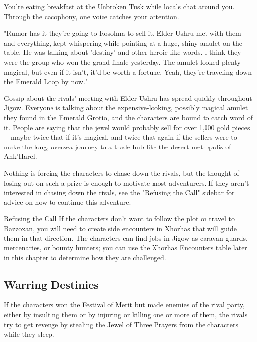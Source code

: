 \documentclass[10pt,a4paper,twoside,bg=print,twocolumn,openany,nodeprecatedcode]{dndbook}
\begin{document}
\begin{DndReadAloud}{}
You're eating breakfast at the Unbroken Tusk while locals chat around you. Through the cacophony, one voice catches your attention.

"Rumor has it they're going to Rosohna to sell it. Elder Ushru met with them and everything, kept whispering while pointing at a huge, shiny amulet on the table. He was talking about 'destiny' and other heroic-like words. I think they were the group who won the grand finale yesterday. The amulet looked plenty magical, but even if it isn't, it'd be worth a fortune. Yeah, they're traveling down the Emerald Loop by now."

\end{DndReadAloud}

Gossip about the rivals' meeting with Elder Ushru has spread quickly throughout Jigow. Everyone is talking about the expensive-looking, possibly magical amulet they found in the Emerald Grotto, and the characters are bound to catch word of it. People are saying that the jewel would probably sell for over 1,000 gold pieces—maybe twice that if it's magical, and twice that again if the sellers were to make the long, oversea journey to a trade hub like the desert metropolis of Ank'Harel.

Nothing is forcing the characters to chase down the rivals, but the thought of losing out on such a prize is enough to motivate most adventurers. If they aren't interested in chasing down the rivals, see the "Refusing the Call" sidebar for advice on how to continue this adventure.

\begin{DndSidebar}[float=!b]{Refusing the Call}
If the characters don't want to follow the plot or travel to Bazzoxan, you will need to create side encounters in Xhorhas that will guide them in that direction. The characters can find jobs in Jigow as caravan guards, mercenaries, or bounty hunters; you can use the Xhorhas Encounters table later in this chapter to determine how they are challenged.



\end{DndSidebar}

\subsection{Warring Destinies}
If the characters won the Festival of Merit but made enemies of the rival party, either by insulting them or by injuring or killing one or more of them, the rivals try to get revenge by stealing the Jewel of Three Prayers from the characters while they sleep.
\end{document}
